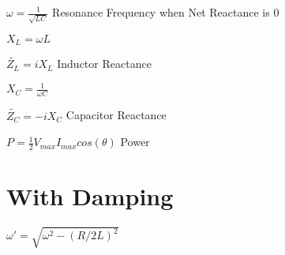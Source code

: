 \documentclass{article}
\begin{document}
\LARGE$\omega=\frac{1}{\sqrt{LC}}$
\large {Resonance Frequency when Net Reactance is 0}

\LARGE$X_L=\omega{L}$

\LARGE$\widetilde{Z_L}=iX_L$
\large {Inductor Reactance}

\LARGE$X_C=\frac{1}{\omega{C}}$

\LARGE$\widetilde{Z_C}=-iX_C$
\large {Capacitor Reactance}


\LARGE$P=\frac{1}{2}V_{max}I_{max}cos(\theta)$
\large {Power}

\section {With Damping}

\LARGE$\omega\prime=\sqrt{\omega^2-(R/2L)^2}$
\end{document}
